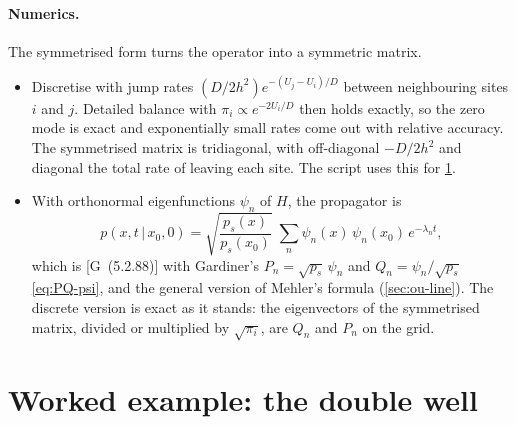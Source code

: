 \documentclass[11pt]{article}
\numberwithin{equation}{section}
\newcommand{\given}{\,|\,}
\newcommand{\G}[1]{[G~(#1)]}
\begin{document}
\paragraph{Numerics.} The symmetrised form turns the operator into a symmetric matrix.
\begin{itemize}
  \item Discretise with jump rates $(D/2h^2)e^{-(U_j-U_i)/D}$ between neighbouring sites $i$ and $j$. Detailed
        balance with $\pi_i\propto e^{-2U_i/D}$ then holds exactly, so the zero mode is exact and exponentially
        small rates come out with relative accuracy. The symmetrised matrix is tridiagonal, with off-diagonal
        $-D/2h^2$ and diagonal the total rate of leaving each site. The script uses this for
        \cref{sec:double-well}.
  \item With orthonormal eigenfunctions $\psi_n$ of $H$, the propagator is
        \begin{equation}
          p(x,t\given x_0,0)=\sqrt{\frac{p_s(x)}{p_s(x_0)}}\;\sum_n\psi_n(x)\,\psi_n(x_0)\,e^{-\lambda_nt},
          \label{eq:sym-prop}
        \end{equation}
        which is \G{5.2.88} with Gardiner's $P_n=\sqrt{p_s}\,\psi_n$ and $Q_n=\psi_n/\sqrt{p_s}$ \cref{eq:PQ-psi},
        and the general version of Mehler's formula (\cref{sec:ou-line}). The discrete version is exact as it
        stands: the eigenvectors of the symmetrised matrix, divided or multiplied by $\sqrt{\pi_i}$, are $Q_n$ and
        $P_n$ on the grid.
\end{itemize}

\section{Worked example: the double well}
\label{sec:double-well}
\end{document}
